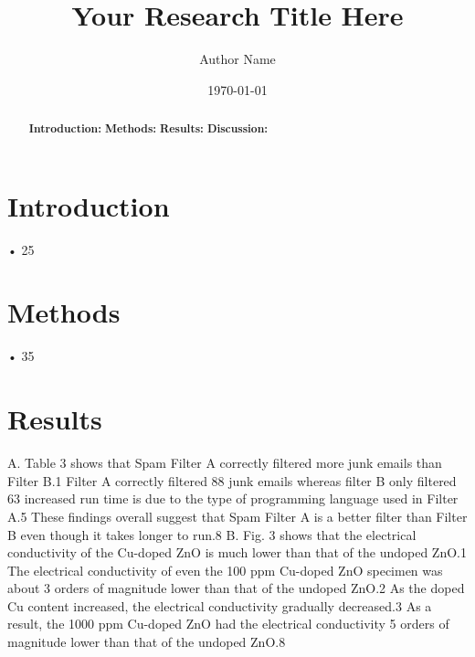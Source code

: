 \documentclass{article}
\title{Your Research Title Here}
\author{Author Name}
\date{\today}
\begin{document}
\maketitle

\begin{abstract}
\textbf{Introduction:} \lipsum[1] %
\textbf{Methods:} \lipsum[2] %
\textbf{Results:} \lipsum[3] %
\textbf{Discussion:} \lipsum[4] %
\end{abstract}

\section{Introduction}
• 25%
\lipsum[1] %

\section{Methods}
• 35%
\lipsum[2] %

\section{Results}
A.
Table	3	shows	that	Spam	Filter	A	correctly	filtered	more	junk	emails	than	Filter	B.1	Filter	A	correctly	filtered	88%
junk	emails	whereas	filter	B	only	filtered	63%
increased run time is due to the type of programming language used in Filter A.5	These	findings	overall	suggest	that	
Spam	Filter	A	is	a	better	filter	than	Filter	B	even	though	it	takes	longer	to	run.8
B.
Fig.	3	shows	that	the	electrical	conductivity	of	the	Cu-doped	ZnO	is	much	lower	than	that	of	the	undoped	ZnO.1 The 
electrical	conductivity	of	even	the	100	ppm	Cu-doped	ZnO	specimen	was	about	3	orders	of	magnitude	lower	than	
that	of	the	undoped	ZnO.2 As the doped Cu content increased, the electrical conductivity gradually decreased.3 As 
a	result,	the	1000	ppm	Cu-doped	ZnO	had	the	electrical	conductivity	5	orders	of	magnitude	lower	than	that	of	the	
undoped	ZnO.8
\lipsum[3] %
\end{document}
